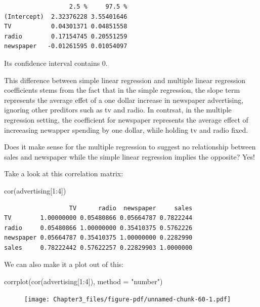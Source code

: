 \documentclass[
  letterpaper,
  DIV=11,
  numbers=noendperiod]{scrreprt}
\newenvironment{Shaded}{\begin{snugshade}}{\end{snugshade}}
\newcommand{\AttributeTok}[1]{\textcolor[rgb]{0.65,0.35,0.00}{#1}}
\newcommand{\DecValTok}[1]{\textcolor[rgb]{0.47,0.16,0.63}{#1}}
\newcommand{\FunctionTok}[1]{\textcolor[rgb]{0.02,0.16,0.49}{#1}}
\newcommand{\NormalTok}[1]{\textcolor[rgb]{0.33,0.33,0.33}{#1}}
\newcommand{\SpecialCharTok}[1]{\textcolor[rgb]{0.00,0.46,0.62}{#1}}
\newcommand{\StringTok}[1]{\textcolor[rgb]{0.00,0.50,0.00}{#1}}
\begin{document}
\begin{verbatim}
                  2.5 %     97.5 %
(Intercept)  2.32376228 3.55401646
TV           0.04301371 0.04851558
radio        0.17154745 0.20551259
newspaper   -0.01261595 0.01054097
\end{verbatim}

Its confidence interval contains 0.

This difference between simple linear regression and multiple linear
regression coefficients stems from the fact that in the simple
regression, the slope term represents the average effet of a one dollar
increase in newspaper advertising, ignoring other preditors such as tv
and radio. In contrsat, in the multiple regression setting, the
coefficient for newspaper represents the average effect of increeasing
newapper spending by one dollar, while holding tv and radio fixed.

Does it make sense for the multiple regression to suggest no
relationship between sales and newspaper while the simple linear
regression implies the opposite? Yes!

Take a look at this correlation matrix:

\begin{Shaded}
\begin{Highlighting}[]
\FunctionTok{cor}\NormalTok{(advertising[}\DecValTok{1}\SpecialCharTok{:}\DecValTok{4}\NormalTok{])}
\end{Highlighting}
\end{Shaded}

\begin{verbatim}
                  TV      radio  newspaper     sales
TV        1.00000000 0.05480866 0.05664787 0.7822244
radio     0.05480866 1.00000000 0.35410375 0.5762226
newspaper 0.05664787 0.35410375 1.00000000 0.2282990
sales     0.78222442 0.57622257 0.22829903 1.0000000
\end{verbatim}

We can also make it a plot out of this:

\begin{Shaded}
\begin{Highlighting}[]
\FunctionTok{corrplot}\NormalTok{(}\FunctionTok{cor}\NormalTok{(advertising[}\DecValTok{1}\SpecialCharTok{:}\DecValTok{4}\NormalTok{]), }\AttributeTok{method =} \StringTok{"number"}\NormalTok{)}
\end{Highlighting}
\end{Shaded}

\begin{figure}[H]

{\centering \texttt{[image: Chapter3\_files/figure-pdf/unnamed-chunk-60-1.pdf]}

}

\end{figure}
\end{document}
